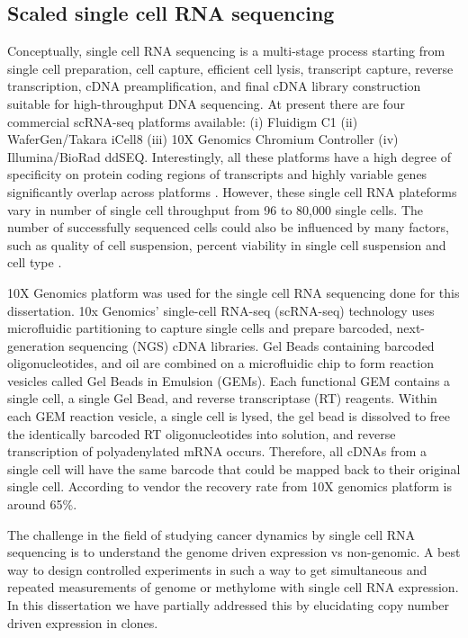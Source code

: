 \subsection{Scaled single cell RNA sequencing}
 Conceptually, single cell RNA sequencing is a multi-stage process starting from single cell preparation, cell capture, efficient cell lysis, transcript capture, reverse transcription, cDNA preamplification, and final cDNA library construction suitable for high-throughput DNA sequencing.
 At present there are four commercial scRNA-seq platforms available: 
(i)	Fluidigm C1 
(ii)	WaferGen/Takara iCell8 
(iii)	10X Genomics Chromium Controller
(iv)	Illumina/BioRad ddSEQ.
Interestingly, all these platforms have a high degree of specificity on protein coding regions of transcripts and highly variable genes significantly overlap across platforms \cite{ashton2020comparative}. However, these single cell RNA plateforms vary in number of single cell throughput from 96 to 80,000 single cells. The number of successfully sequenced cells could also be influenced by many factors, such as quality of cell suspension, percent viability in single cell suspension and cell type \cite{o2019dissociation}. 

10X Genomics platform was used for the single cell RNA sequencing done for this dissertation. 10x Genomics' single-cell RNA-seq (scRNA-seq) technology uses microfluidic partitioning to capture single cells and prepare barcoded, next-generation sequencing (NGS) cDNA libraries. Gel Beads containing barcoded oligonucleotides, and oil are combined on a microfluidic chip to form reaction vesicles called Gel Beads in Emulsion (GEMs). Each functional GEM contains a single cell, a single Gel Bead, and reverse transcriptase (RT) reagents. Within each GEM reaction vesicle, a single cell is lysed, the gel bead is dissolved to free the identically barcoded RT oligonucleotides into solution, and reverse transcription of polyadenylated mRNA occurs. Therefore, all cDNAs from a single cell will have the same barcode that could be mapped back to their original single cell. According to vendor the recovery rate from 10X genomics platform is around 65\%.

The challenge in the field of studying cancer dynamics by single cell RNA sequencing is to understand the genome driven expression vs non-genomic. A best way to design controlled experiments in such a way to get simultaneous and repeated measurements of genome or methylome with single cell RNA expression. In this dissertation we have partially addressed this by elucidating copy number driven expression in clones.



